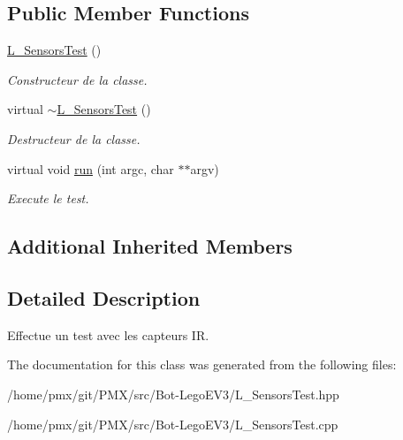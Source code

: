 \subsection*{Public Member Functions}
\begin{DoxyCompactItemize}
\item 
\mbox{\label{classL__SensorsTest_af51e5af9864e8c6b50c3b458d3776413}} 
\hyperlink{classL__SensorsTest_af51e5af9864e8c6b50c3b458d3776413}{L\+\_\+\+Sensors\+Test} ()
\begin{DoxyCompactList}\small\item\em Constructeur de la classe. \end{DoxyCompactList}\item 
\mbox{\label{classL__SensorsTest_ac8f034d1b6113c64fb7d0032022003ba}} 
virtual \hyperlink{classL__SensorsTest_ac8f034d1b6113c64fb7d0032022003ba}{$\sim$\+L\+\_\+\+Sensors\+Test} ()
\begin{DoxyCompactList}\small\item\em Destructeur de la classe. \end{DoxyCompactList}\item 
\mbox{\label{classL__SensorsTest_a2f73f467b8367f1d8e85cbff388c89cf}} 
virtual void \hyperlink{classL__SensorsTest_a2f73f467b8367f1d8e85cbff388c89cf}{run} (int argc, char $\ast$$\ast$argv)
\begin{DoxyCompactList}\small\item\em Execute le test. \end{DoxyCompactList}\end{DoxyCompactItemize}
\subsection*{Additional Inherited Members}


\subsection{Detailed Description}
Effectue un test avec les capteurs IR. 

The documentation for this class was generated from the following files\+:\begin{DoxyCompactItemize}
\item 
/home/pmx/git/\+P\+M\+X/src/\+Bot-\/\+Lego\+E\+V3/L\+\_\+\+Sensors\+Test.\+hpp\item 
/home/pmx/git/\+P\+M\+X/src/\+Bot-\/\+Lego\+E\+V3/L\+\_\+\+Sensors\+Test.\+cpp\end{DoxyCompactItemize}
